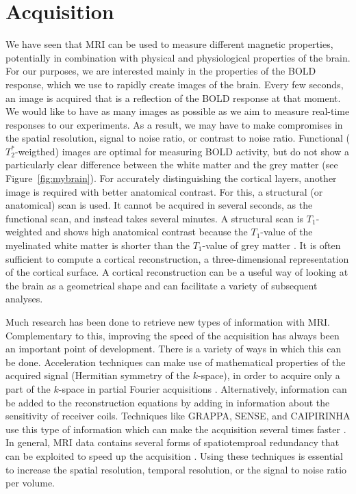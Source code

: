 \section*{Acquisition}
We have seen that MRI can be used to measure different magnetic properties, potentially in combination with physical and physiological properties of the brain. For our purposes, we are interested mainly in the properties of the BOLD response, which we use to rapidly create images of the brain. Every few seconds, an image is acquired that is a reflection of the BOLD response at that moment. We would like to have as many images as possible as we aim to measure real-time responses to our experiments. As a result, we may have to make compromises in the spatial resolution, signal to noise ratio, or contrast to noise ratio. Functional ($T_2^*$-weigthed) images are optimal for measuring BOLD activity, but do not show a particularly clear difference between the white matter and the grey matter (see Figure~\ref{fig:mybrain}). For accurately distinguishing the cortical layers, another image is required with better anatomical contrast. For this, a structural (or anatomical) scan is used. It cannot be acquired in several seconds, as the functional scan, and instead takes several minutes. A structural scan is $T_1$-weighted and shows high anatomical contrast because the $T_1$-value of the myelinated white matter is shorter than the $T_1$-value of grey matter \cite{Wansapura1999}. It is often sufficient to compute a cortical reconstruction, a three-dimensional representation of the cortical surface. A cortical reconstruction can be a useful way of looking at the brain as a geometrical shape and can facilitate a variety of subsequent analyses.


Much research has been done to retrieve new types of information with MRI. Complementary to this, improving the speed of the acquisition has always been an important point of development. There is a variety of ways in which this can be done. Acceleration techniques can make use of mathematical properties of the acquired signal (Hermitian symmetry of the $k$-space), in order to acquire only a part of the $k$-space in partial Fourier acquisitions \cite{Feinberg1986}. Alternatively, information can be added to the reconstruction equations by adding in information about the sensitivity of receiver coils. Techniques like GRAPPA, SENSE, and CAIPIRINHA use this type of information which can make the acquisition several times faster \cite{Setsompop2016}. In general, MRI data contains several forms of spatiotemproal redundancy that can be exploited to speed up the acquisition \cite{Tsao2012}. Using these techniques is essential to increase the spatial resolution, temporal resolution, or the signal to noise ratio per volume.

